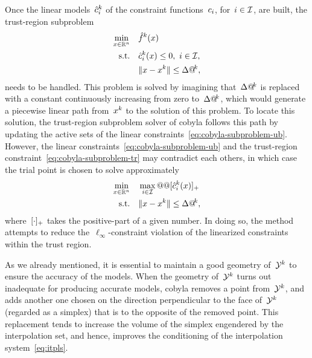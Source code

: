 Once the linear models~$\conm[k]{i}$ of the constraint functions~$c_{i}$, for~$i \in \mathcal{I}$, are built, the trust-region subproblem
\begin{subequations}
    \label{eq:cobyla-subproblem}
    \begin{align}
        \min_{\iter \in \R^n}   & \quad \objm[k](\iter)\\
        \text{s.t.}             & \quad \conm[k]{i}(\iter) \le 0, ~ i \in \iub, \label{eq:cobyla-subproblem-ub}\\
                                & \quad \norm{\iter - \iter[k]} \le \rad[k], \label{eq:cobyla-subproblem-tr}
    \end{align}
\end{subequations}
needs to be handled.
This problem is solved by imagining that~$\rad[k]$ is replaced with a constant continuously increasing from zero to~$\rad[k]$, which would generate a piecewise linear path from~$\iter[k]$ to the solution of this problem.
To locate this solution, the trust-region subproblem solver of \gls{cobyla} follows this path by updating the active sets of the linear constraints~\cref{eq:cobyla-subproblem-ub}.
However, the linear constraints~\cref{eq:cobyla-subproblem-ub} and the trust-region constraint~\cref{eq:cobyla-subproblem-tr} may contradict each others, in which case the trial point is chosen to solve approximately
\begin{align*}
    \min_{\iter \in \R^n}   & \quad \max_{i \in \iub} @@ \posp{\conm[k]{i}(\iter)}\\
    \text{s.t.}             & \quad \norm{\iter - \iter[k]} \le \rad[k],
\end{align*}
%
where~$[\cdot]_+$ takes the positive-part of a given number.
In doing so, the method attempts to reduce the~$\ell_{\infty}$-constraint violation of the linearized constraints within the trust region.

As we already mentioned, it is essential to maintain a good geometry of~$\xpt[k]$ to ensure the accuracy of the models.
When the geometry of~$\xpt[k]$ turns out inadequate for producing accurate models, \gls{cobyla} removes a point from~$\xpt[k]$, and adds another one chosen on the direction perpendicular to the face of~$\xpt[k]$ (regarded as a simplex) that is to the opposite of the removed point.
This replacement tends to increase the volume of the simplex engendered by the interpolation set, and hence, improves the conditioning of the interpolation system~\cref{eq:itpls}.

